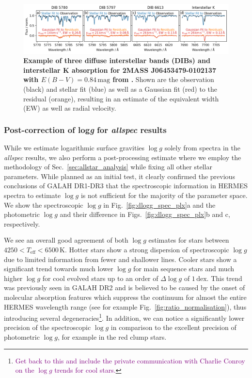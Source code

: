 \documentclass[
  journal=pasa,
  manuscript=research-paper, %
  year=2023,
  volume=37
]{cup-journal}
\newcommand{\SB}[1]{{\textcolor{purple}{#1}}}
\newcommand{\logg}{$\log g$\xspace}
\begin{document}
\begin{figure}[ht]
 \centering
 \includegraphics[width=\textwidth]{figures/example_dibs_06453479-0102137.png}
 \caption{\textbf{Example of three diffuse interstellar bands (DIBs) and interstellar K absorption for 2MASS J06453479-0102137 with $E(B-V) = 0.84\,\mathrm{mag}$ from \citet{Schlegel1998}.} Shown are the observation (black) and stellar fit (blue) as well as a Gaussian fit (red) to the residual (orange), resulting in an estimate of the equivalent width (EW) as well as radial velocity.} %
 \label{fig:example_dibs_06453479-0102137}
\end{figure}

\subsubsection{Post-correction of {log\textit{g}} for \textit{allspec} results}

While we estimate logarithmic surface gravities \logg solely from spectra in the \textit{allspec} results, we also perform a post-processing estimate where we employ the methodology of Sec.~\ref{sec:allstar_analysis} while fixing all other stellar parameters. While planned as an initial test, it clearly confirmed the previous conclusions of GALAH DR1-DR3 that the spectroscopic information in HERMES spectra to estimate \logg is not sufficient for the majority of the parameter space. We show the spectroscopic \logg in Fig.~\ref{fig:dlogg_spec_plx}a and the photometric \logg and their difference in Figs.~\ref{fig:dlogg_spec_plx}b and c, respectively.

We see an overall good agreement of both \logg estimates for stars between $4250 < T_\text{eff} < 6500\,\mathrm{K}$. Hotter stars show a strong dispersion of spectroscopic \logg due to limited information from fewer and shallower lines. Cooler stars show a significant trend towards much lower \logg for main sequence stars and much higher \logg for cool evolved stars up to an order of $\Delta \log g$ of $1\,\mathrm{dex}$. This trend was previously seen in GALAH DR2 \citep{Buder2018} and is believed to be caused by the onset of molecular absorption features which suppress the continuum for almost the entire HERMES wavelength range (see for example Fig.~\ref{fig:ratio_normalisation}), thus introducing several degeneracies\footnote{\SB{Get back to this and include the private communication with Charlie Conroy on the \logg trends for cool stars.}}. In addition, we can notice a significantly lower precision of the spectroscopic \logg in comparison to the excellent precision of photometric \logg, for example in the red clump stars.
\end{document}
